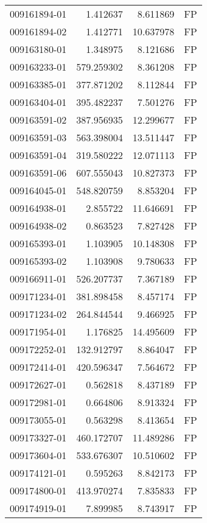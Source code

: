\begin{tabular}{lrrl}
009161894-01 &    1.412637 &     8.611869 &   FP \\
009161894-02 &    1.412771 &    10.637978 &   FP \\
009163180-01 &    1.348975 &     8.121686 &   FP \\
009163233-01 &  579.259302 &     8.361208 &   FP \\
009163385-01 &  377.871202 &     8.112844 &   FP \\
009163404-01 &  395.482237 &     7.501276 &   FP \\
009163591-02 &  387.956935 &    12.299677 &   FP \\
009163591-03 &  563.398004 &    13.511447 &   FP \\
009163591-04 &  319.580222 &    12.071113 &   FP \\
009163591-06 &  607.555043 &    10.827373 &   FP \\
009164045-01 &  548.820759 &     8.853204 &   FP \\
009164938-01 &    2.855722 &    11.646691 &   FP \\
009164938-02 &    0.863523 &     7.827428 &   FP \\
009165393-01 &    1.103905 &    10.148308 &   FP \\
009165393-02 &    1.103908 &     9.780633 &   FP \\
009166911-01 &  526.207737 &     7.367189 &   FP \\
009171234-01 &  381.898458 &     8.457174 &   FP \\
009171234-02 &  264.844544 &     9.466925 &   FP \\
009171954-01 &    1.176825 &    14.495609 &   FP \\
009172252-01 &  132.912797 &     8.864047 &   FP \\
009172414-01 &  420.596347 &     7.564672 &   FP \\
009172627-01 &    0.562818 &     8.437189 &   FP \\
009172981-01 &    0.664806 &     8.913324 &   FP \\
009173055-01 &    0.563298 &     8.413654 &   FP \\
009173327-01 &  460.172707 &    11.489286 &   FP \\
009173604-01 &  533.676307 &    10.510602 &   FP \\
009174121-01 &    0.595263 &     8.842173 &   FP \\
009174800-01 &  413.970274 &     7.835833 &   FP \\
009174919-01 &    7.899985 &     8.743917 &   FP \\

\end{tabular}
